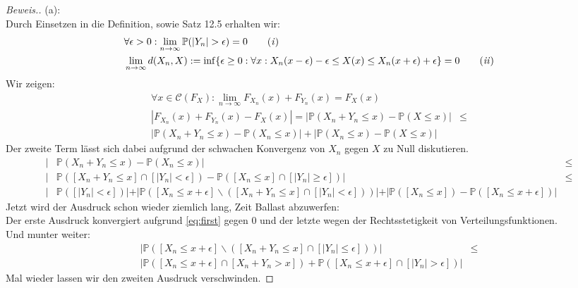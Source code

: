 \begin{proof}[Beweis.]
(a): \\
Durch Einsetzen in die Definition, sowie Satz 12.5 erhalten wir:
\begin{align*}
&\forall \epsilon > 0:  \lim_{n \rightarrow \infty} \mathbb{P}(| Y_n | > \epsilon) = 0  \tag{\textit{i}} \label{eq:first} \\
&\lim_{n \rightarrow \infty} d(X_n,X) := \inf \{\epsilon \geq 0: \forall x: X_n(x - \epsilon) - \epsilon \leq X(x) \leq X_n(x + \epsilon) + \epsilon\} = 0 \tag{\textit{ii}} \label{eq:second} \\
\end{align*}
Wir zeigen:
\begin{align*}
  \forall x \in \mathcal{C}(F_X): \lim_{n \rightarrow \infty} F_{X_n}(x) + F_{Y_n}(x) = F_X(x)& \\
  | F_{X_n}(x) + F_{Y_n}(x) - F_X(x) | = | \mathbb{P}(X_n + Y_n \leq x) - \mathbb{P}(X \leq x) | &\leq \\
  | \mathbb{P}(X_n + Y_n \leq x) - \mathbb{P}(X_n \leq x) | + | \mathbb{P}(X_n \leq x) - \mathbb{P}(X \leq x) |
\end{align*}
Der zweite Term lässt sich dabei aufgrund der schwachen Konvergenz von $X_n$ gegen $X$ zu Null diskutieren.
\begin{align*}
  | &\mathbb{P}(X_n + Y_n \leq x) - \mathbb{P}(X_n \leq x) | &\leq \\
  | &\mathbb{P}([X_n + Y_n \leq x] \cap [|Y_n| < \epsilon]) - \mathbb{P}([X_n \leq x] \cap [|Y_n| \geq \epsilon]) | &\leq \\
  | &\mathbb{P}([|Y_n| < \epsilon]) | + | \mathbb{P}([X_n \leq x + \epsilon]\backslash ([X_n + Y_n \leq x] \cap [|Y_n| < \epsilon])) |
  + | \mathbb{P}([X_n \leq x]) - \mathbb{P}([X_n \leq x + \epsilon]) |
\end{align*}
Jetzt wird der Ausdruck schon wieder ziemlich lang, Zeit Ballast abzuwerfen: \\
Der erste Ausdruck konvergiert aufgrund \ref{eq:first} gegen 0 und der letzte wegen der Rechtsstetigkeit von Verteilungsfunktionen. \\
Und munter weiter:
\begin{align*}
  | \mathbb{P}([X_n \leq x + \epsilon] \backslash ([X_n + Y_n \leq x] \cap [|Y_n| \leq \epsilon])) | &\leq \\
  | \mathbb{P}([X_n \leq x + \epsilon] \cap [X_n + Y_n > x]) + \mathbb{P}([X_n \leq x + \epsilon] \cap [|Y_n| > \epsilon]) | &
\end{align*}
Mal wieder lassen wir den zweiten Ausdruck verschwinden.

\end{proof}
